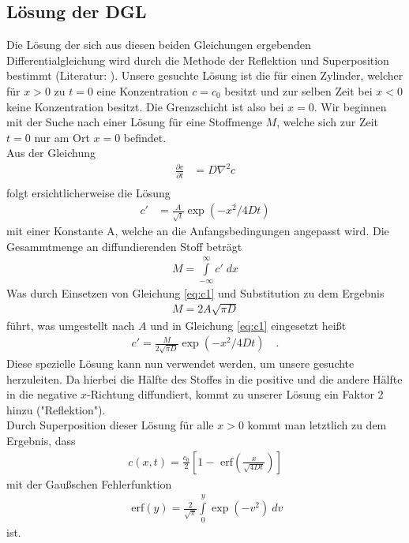 \documentclass[12pt,a4paper,titlepage,headinclude,bibtotoc]{scrartcl}
\newcommand{\erf}[1]{\text{ erf}\ensuremath{\left( #1 \right)}}
\begin{document}
\subsection{Lösung der DGL}
Die Lösung der sich aus diesen beiden Gleichungen ergebenden Differentialgleichung wird durch die Methode der Reflektion und Superposition bestimmt (Literatur: \cite[S. 11]{crank}).
Unsere gesuchte Lösung ist die für einen Zylinder, welcher für $x>0$ zu $t=0$ eine Konzentration $c=c_0$ besitzt und zur selben Zeit bei $x<0$ keine Konzentration besitzt.
Die Grenzschicht ist also bei $x=0$.
Wir beginnen mit der Suche nach einer Lösung für eine Stoffmenge $M$, welche sich zur Zeit $t=0$ nur am Ort $x=0$ befindet.\\
Aus der Gleichung
\begin{align*}
\frac{\partial c}{\partial t}&=D\nabla^2 c\\
\end{align*}
folgt ersichtlicherweise die Lösung
\begin{align}
c'&=\frac{A}{\sqrt{t}}\exp\left(-x^2/4Dt \right)\label{eq:c1}
\end{align}
mit einer Konstante A, welche an die Anfangsbedingungen angepasst wird.
Die Gesammtmenge an diffundierenden Stoff beträgt
\begin{align*}
M=\int\limits_{-\infty}^\infty c' \; dx
\end{align*}
Was durch Einsetzen von Gleichung \eqref{eq:c1} und Substitution zu dem Ergebnis
\begin{align*}
M=2A\sqrt{\pi D}
\end{align*}
führt, was umgestellt nach $A$ und in Gleichung \eqref{eq:c1} eingesetzt heißt
\begin{align*}
c'=\frac{M}{2\sqrt{\pi D}}\exp\left(-x^2/4Dt\right)\quad .
\end{align*}
Diese spezielle Lösung kann nun verwendet werden, um unsere gesuchte herzuleiten.
Da hierbei die Hälfte des Stoffes in die positive und die andere Hälfte in die negative $x$-Richtung diffundiert, kommt zu unserer Lösung ein Faktor 2 hinzu ("Reflektion").\\
Durch Superposition dieser Lösung für alle $x>0$ kommt man letztlich zu dem Ergebnis, dass
\begin{align}
c(x,t)=\frac{c_0}{2}\left[1-\erf{\frac{x}{\sqrt{4Dt}}}\right] \label{eq:c}
\end{align}
mit der Gaußschen Fehlerfunktion
\begin{align*}
\erf{y}=\frac{2}{\sqrt{\pi}}\int\limits_0^y\exp\left(-v^2\right)~dv
\end{align*}
ist.
\end{document}

